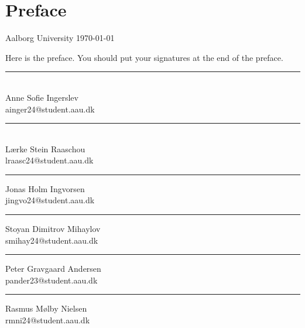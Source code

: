 \chapter*{Preface}
\raggedright \hfill Aalborg University \today

\vspace{3em}

\noindent Here is the preface. You should put your signatures at the end of the preface.

\vspace{3cm}
\vfill\noindent
\begin{minipage}[b]{0.45\textwidth}
 \centering
 \rule{\textwidth}{0.5pt}\\
 Anne Sofie Ingerslev \\
 {\footnotesize ainger24@student.aau.dk}
\end{minipage}
\hfill
\begin{minipage}[b]{0.45\textwidth}
 \centering
 \rule{\textwidth}{0.45pt}\\
 Lærke Stein Raaschou \\
 {\footnotesize lraasc24@student.aau.dk}
\end{minipage}
\vspace{3\baselineskip}
\begin{center}
\begin{minipage}[b]{0.45\textwidth}
 \centering
 \rule{\textwidth}{0.45pt}
 Jonas Holm Ingvorsen \\
 {\footnotesize jingvo24@student.aau.dk}
\end{minipage}
\hfill
\begin{minipage}[b]{0.45\textwidth}
 \centering
 \rule{\textwidth}{0.5pt}
 Stoyan Dimitrov Mihaylov\\
 {\footnotesize smihay24@student.aau.dk}
\end{minipage}
\end{center}
\vspace{3\baselineskip}
\begin{center}
\begin{minipage}[b]{0.45\textwidth}
 \centering
 \rule{\textwidth}{0.45pt}
 Peter Gravgaard Andersen \\
 {\footnotesize pander23@student.aau.dk}
\end{minipage}
\hfill
\begin{minipage}[b]{0.45\textwidth}
 \centering
 \rule{\textwidth}{0.45pt}
 Rasmus Mølby Nielsen \\
 {\footnotesize rmni24@student.aau.dk}
\end{minipage}
\end{center}






\begin{comment}
\begin{center}
\begin{minipage}[b]{0.45\textwidth}
 \centering
 \rule{\textwidth}{0.5pt}
 Name\\
 {\footnotesize <mail>}
\end{minipage}
\hfill
\end{center}
\end{comment}

